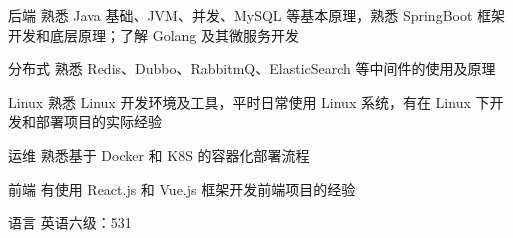 

\begin{cvskills}


  \cvskill
    {后端} %
    {熟悉 Java 基础、JVM、并发、MySQL 等基本原理，熟悉 SpringBoot 框架开发和底层原理；了解 Golang 及其微服务开发 } %

  \cvskill
    {分布式} %
    {熟悉 Redis、Dubbo、RabbitmQ、ElasticSearch 等中间件的使用及原理} %


  \cvskill
    {Linux} %
    {熟悉 Linux 开发环境及工具，平时日常使用 Linux 系统，有在 Linux 下开发和部署项目的实际经验 } %

  \cvskill
    {运维} %
    {熟悉基于 Docker 和 K8S 的容器化部署流程} %

  \cvskill
    {前端} %
    {有使用 React.js 和 Vue.js 框架开发前端项目的经验} %

  \cvskill
    {语言} %
    {英语六级：531} %

\end{cvskills}
